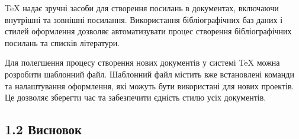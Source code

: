 {   \par
  TeX надає зручні засоби для створення посилань в документах, включаючи внутрішні
  та зовнішні посилання. Використання бібліографічних баз даних і стилей оформлення
  дозволяє автоматизувати процес створення бібліографічних посилань та списків літератури. \par

   \par
  Для полегшення процесу створення нових документів у системі TeX можна розробити шаблонний файл.
  Шаблонний файл містить вже встановлені команди та налаштування оформлення, які можуть бути використані
  для нових проектів. Це дозволяє зберегти час та забезпечити єдність стилю усіх документів. \par
  \subsection{1.2 Висновок}
   \par


  \newpage
}